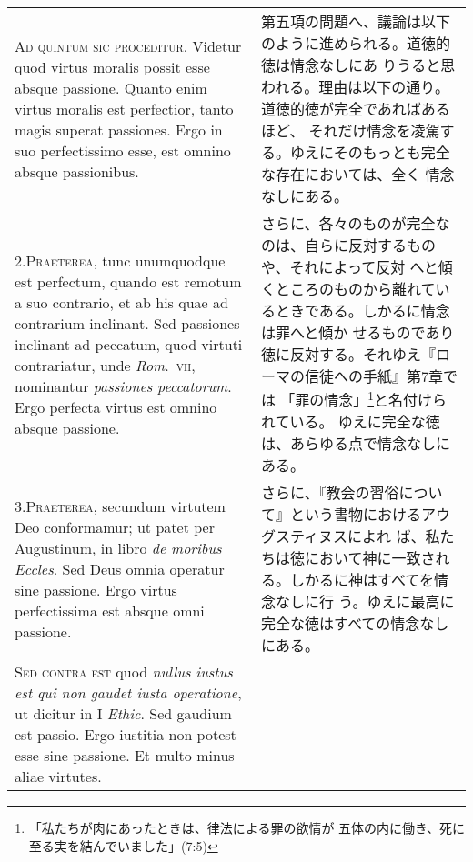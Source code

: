 \documentclass[10pt]{jsarticle}
\begin{document}
\begin{longtable}{p{21em}p{21em}}
{\scshape Ad quintum sic proceditur}. Videtur quod virtus moralis
possit esse absque passione. Quanto enim virtus moralis est
perfectior, tanto magis superat passiones. Ergo in suo perfectissimo
esse, est omnino absque passionibus.
 
&

 第五項の問題へ、議論は以下のように進められる。道徳的徳は情念なしにあ
 りうると思われる。理由は以下の通り。道徳的徳が完全であればあるほど、
 それだけ情念を凌駕する。ゆえにそのもっとも完全な存在においては、全く
 情念なしにある。

 \\

2.{\scshape Praeterea}, tunc unumquodque est perfectum, quando est
remotum a suo contrario, et ab his quae ad contrarium inclinant. Sed
passiones inclinant ad peccatum, quod virtuti contrariatur, unde
{\itshape Rom}.~{\scshape vii}, nominantur {\itshape passiones
peccatorum}. Ergo perfecta virtus est omnino absque passione.

 &

さらに、各々のものが完全なのは、自らに反対するものや、それによって反対
へと傾くところのものから離れているときである。しかるに情念は罪へと傾か
せるものであり徳に反対する。それゆえ『ローマの信徒への手紙』第7章では
「罪の情念」\footnote{「私たちが肉にあったときは、律法による罪の欲情が
五体の内に働き、死に至る実を結んでいました」(7:5)}と名付けられている。
ゆえに完全な徳は、あらゆる点で情念なしにある。
 
\\


3.{\scshape Praeterea}, secundum virtutem Deo conformamur; ut patet
per Augustinum, in libro {\itshape de moribus Eccles}. Sed Deus omnia operatur
sine passione. Ergo virtus perfectissima est absque omni passione.
 
&

さらに、『教会の習俗について』という書物におけるアウグスティヌスによれ
ば、私たちは徳において神に一致される。しかるに神はすべてを情念なしに行
う。ゆえに最高に完全な徳はすべての情念なしにある。

 
\\




 {\scshape Sed contra est} quod {\itshape nullus iustus est qui non
 gaudet iusta operatione}, ut dicitur in I {\itshape Ethic}. Sed
 gaudium est passio. Ergo iustitia non potest esse sine passione. Et
 multo minus aliae virtutes.
 

\end{longtable}
\end{document}
